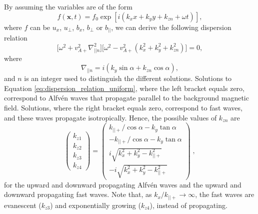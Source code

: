 \documentclass[linenumbers]{aastex63}
\let\vec\boldsymbol
\begin{document}
By assuming the variables are of the form 
\begin{equation}
    f(\vec{x},t) = f_0 \exp[i(k_x x + k_y y + k_{zn} + \omega t)],
\end{equation}
where $f$ can be $u_x$, $u_\perp$, $b_x$, $b_\perp$ or $b_{||}$, we can derive the following dispersion relation
\begin{equation}
    \label{eq:dispersion_relation_uniform}
    \Big[\omega^2 + v_{A+}^2\nabla_{||n}^2\Big]\Big[\omega^2 - v_{A+}^2(k_x^2 + k_y^2 + k_{zn}^2)\Big]=0,
\end{equation}
where 
\begin{equation}
    \nabla_{||n} = i(k_y \sin\alpha + k_{zn}\cos\alpha),
\end{equation}
and $n$ is an integer used to distinguish the different solutions.
Solutions to Equation \eqref{eq:dispersion_relation_uniform}, where the left bracket equals zero, correspond to Alfv\'en waves that propagate parallel to the background magnetic field. Solutions, where the right bracket equals zero, correspond to fast waves, and these waves propagate isotropically.
Hence, the possible values of $k_{zn}$ are
\begin{equation}
    \begin{pmatrix}
    k_{z1} \\
    k_{z2} \\
    k_{z3} \\
    k_{z4}
    \end{pmatrix}
    =
    \begin{pmatrix}
    k_{||+} / \cos\alpha - k_y \tan\alpha \\
    -k_{||+} / \cos\alpha - k_y \tan\alpha \\
    i\sqrt{k_x^2 + k_y^2 - k_{||+}^2} \\
    -i\sqrt{k_x^2 + k_y^2 - k_{||+}^2}
    \end{pmatrix}\; ,
\end{equation}
for the upward and downward propagating Alfv\'en waves and the
upward and downward propagating fast waves. Note that, as $k_x/k_{||+} \rightarrow \infty$, 
the fast waves are evanescent ($k_{z3}$) and 
exponentially growing ($k_{z4}$), instead of propagating.
\end{document}
